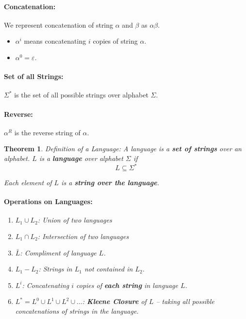 \documentclass[a4paper,12pt]{report}
\newtheorem{theorem}{Theorem}
\begin{document}
\paragraph{Concatenation: } We represent concatenation of string $\alpha$ and $\beta$ as $\alpha\beta$.
\begin{itemize}
\item $\alpha^i$ means concatenating $i$ copies of string $\alpha$.
\item $\alpha^0 = \varepsilon$.
\end{itemize}

\paragraph{Set of all Strings: } $\Sigma^*$ is the set of all possible strings over alphabet $\Sigma$.

\paragraph{Reverse: } $\alpha^R$ is the reverse string of $\alpha$.

\begin{theorem}{Definition of a Language:}
A language is a \textbf{set of strings} over an alphabet. $L$ is a \textbf{language} over alphabet $\Sigma$ if
\begin{equation}
L\subseteq \Sigma^*
\end{equation}

Each element of $L$ is a \textbf{string over the language}.

\paragraph{Operations on Languages: } 
\begin{enumerate}
\item $L_1 \cup L_2$: Union of two languages
\item $L_1 \cap L_2$: Intersection of two languages
\item $\bar L$: Compliment of language $L$.
\item $L_1 - L_2$: Strings in $L_1$ not contained in $L_2$. 
\item $L^i$: Concatenating $i$ copies of \textbf{each string} in language $L$.
\item $L^* = L^0 \cup L^1 \cup L^2 \cup ...$: \textbf{Kleene Closure} of $L$ -- taking all possible concatenations of strings in the language. 
\end{enumerate}
\end{theorem}
\end{document}
